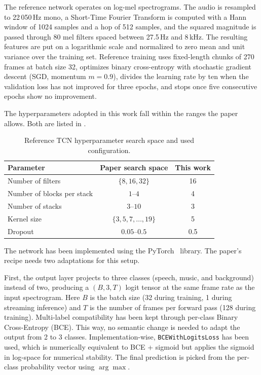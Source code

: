 The reference network operates on log-mel spectrograms.
The audio is resampled to 22\,050\,Hz mono, a Short-Time Fourier Transform is computed with a Hann window of 1024 samples and a hop of 512 samples, and the squared magnitude is passed through 80 mel filters spaced between 27.5\,Hz and 8\,kHz.
The resulting features are put on a logarithmic scale and normalized to zero mean and unit variance over the training set.
Reference training uses fixed-length chunks of 270 frames at batch size 32, optimizes binary cross-entropy with stochastic gradient descent (SGD, momentum $m = 0.9$), divides the learning rate by ten when the validation loss has not improved for three epochs, and stops once five consecutive epochs show no improvement.

The hyperparameters adopted in this work fall within the ranges the paper allows.
Both are listed in .

\begin{table}[htbp]
\centering
\begin{tabular}{lcc}
\hline
Parameter & Paper search space & This work \\
\hline
Number of filters & $\{8, 16, 32\}$ & 16 \\
Number of blocks per stack & $1\text{--}4$ & 4 \\
Number of stacks & $3\text{--}10$ & 3 \\
Kernel size & $\{3, 5, 7, \ldots, 19\}$ & 5 \\
Dropout & $0.05\text{--}0.5$ & 0.5 \\
\hline
\end{tabular}
\caption{Reference TCN hyperparameter search space and used configuration.}
\label{tab:tcn_paper_search}
\end{table}

The network has been implemented using the PyTorch~\cite{paszke2019pytorch} library.
The paper's recipe needs two adaptations for this setup.

First, the output layer projects to three classes (speech, music, and background) instead of two, producing a $(B, 3, T)$ logit tensor at the same frame rate as the input spectrogram.
Here $B$ is the batch size (32 during training, 1 during streaming inference) and $T$ is the number of frames per forward pass (128 during training).
Multi-label compatibility has been kept through per-class Binary Cross-Entropy (BCE).
This way, no semantic change is needed to adapt the output from 2 to 3 classes.
Implementation-wise, \texttt{BCEWithLogitsLoss} has been used, which is numerically equivalent to BCE + sigmoid but applies the sigmoid in log-space for numerical stability.
The final prediction is picked from the per-class probability vector using $\arg\max$.

